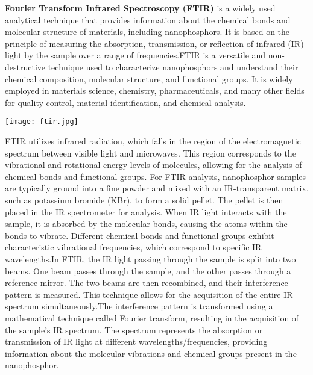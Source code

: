 \documentclass[../characterization.tex]{subfiles}
\begin{document}
    \textbf{Fourier Transform Infrared Spectroscopy (FTIR)} is a widely used analytical technique that provides 
    information about the chemical bonds and molecular structure of materials, including nanophosphors. It is 
    based on the principle of measuring the absorption, transmission, or reflection of infrared (IR) light by the 
    sample over a range of frequencies.FTIR is a versatile and non-destructive technique used to characterize 
    nanophosphors and understand their chemical composition, molecular structure, and functional groups. It is 
    widely employed in materials science, chemistry, pharmaceuticals, and many other fields for quality control, 
    material identification, and chemical analysis.
    \begin{Figure}
        \centering
        \texttt{[image: ftir.jpg]}
        \label{fig:ftir}
    \end{Figure}
    FTIR utilizes infrared radiation, which falls in the region of the electromagnetic spectrum between visible 
    light and microwaves. This region corresponds to the vibrational and rotational energy levels of molecules, 
    allowing for the analysis of chemical bonds and functional groups. For FTIR analysis, nanophosphor samples are 
    typically ground into a fine powder and mixed with an IR-transparent matrix, such as potassium bromide (KBr), 
    to form a solid pellet. The pellet is then placed in the IR spectrometer for analysis. When IR light interacts 
    with the sample, it is absorbed by the molecular bonds, causing the atoms within the bonds to vibrate. 
    Different chemical bonds and functional groups exhibit characteristic vibrational frequencies, which 
    correspond to specific IR wavelengths.In FTIR, the IR light passing through the sample is split into two 
    beams. One beam passes through the sample, and the other passes through a reference mirror. The two beams are 
    then recombined, and their interference pattern is measured. This technique allows for the acquisition of the 
    entire IR spectrum simultaneously.The interference pattern is transformed using a mathematical technique 
    called Fourier transform, resulting in the acquisition of the sample's IR spectrum. The spectrum represents 
    the absorption or transmission of IR light at different wavelengths/frequencies, providing information about 
    the molecular vibrations and chemical groups present in the nanophosphor.
\end{document}
